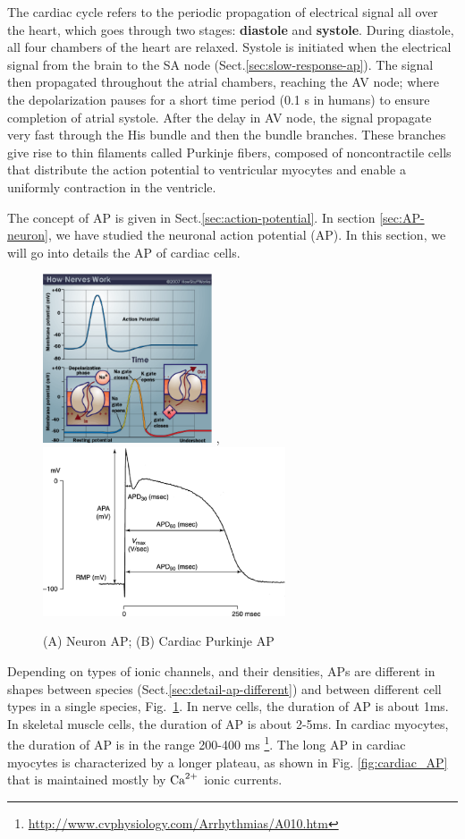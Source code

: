 The cardiac cycle refers to the periodic propagation of electrical signal all
over the heart, which goes through two stages: {\bf diastole} and {\bf systole}.
During diastole, all four chambers of the heart are relaxed. Systole is
initiated when the electrical signal from the brain to the SA node
(Sect.\ref{sec:slow-response-ap}). The signal then propagated throughout the
atrial chambers, reaching the AV node; where the depolarization pauses for a
short time period (0.1 s in humans) to ensure completion of atrial systole.
After the delay in AV node, the signal propagate very fast through the His
bundle and then the bundle branches.
These branches give rise to thin filaments called Purkinje fibers, composed of
noncontractile cells that distribute the action potential to ventricular
myocytes and enable a uniformly contraction in the ventricle.

The concept of AP is given in Sect.\ref{sec:action-potential}.
In section \ref{sec:AP-neuron}, we have studied the neuronal
action potential (AP). In this section, we will go into details the AP
of cardiac cells.  

\begin{figure}[hbt]
  \centerline{\includegraphics[height=5cm,
    angle=0]{./images/nodal-AP.eps}
    ,\includegraphics[height=5cm,
    angle=0]{./images/cardiac-AP.eps} }
  \caption{(A) Neuron AP; (B) Cardiac Purkinje AP}
  \label{fig:nerve-cardiac-AP}
\end{figure}

Depending on types of ionic channels, and their densities, APs are different in
shapes between species (Sect.\ref{sec:detail-ap-different}) and between
different cell types in a single species, Fig.~\ref{fig:nerve-cardiac-AP}.
In nerve cells, the duration of AP is about 1ms. In skeletal muscle cells, the
duration of AP is about 2-5ms. In cardiac myocytes, the duration of AP is in the
range 200-400 ms
\footnote{\url{http://www.cvphysiology.com/Arrhythmias/A010.htm}}.
The long AP in cardiac myocytes is characterized by a longer plateau, as shown
in Fig. \ref{fig:cardiac_AP} that is maintained mostly by ${\text{Ca}^{2+}}$ ionic currents.


